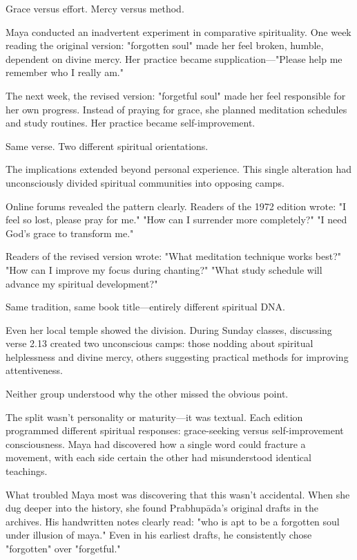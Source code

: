 \documentclass[11pt,twoside]{book}
\begin{document}
Grace versus effort. Mercy versus method.

Maya conducted an inadvertent experiment in comparative spirituality. One week reading the original version: "forgotten soul" made her feel broken, humble, dependent on divine mercy. Her practice became supplication—"Please help me remember who I really am."

The next week, the revised version: "forgetful soul" made her feel responsible for her own progress. Instead of praying for grace, she planned meditation schedules and study routines. Her practice became self-improvement.

Same verse. Two different spiritual orientations.

The implications extended beyond personal experience. This single alteration had unconsciously divided spiritual communities into opposing camps.

Online forums revealed the pattern clearly. Readers of the 1972 edition wrote: "I feel so lost, please pray for me." "How can I surrender more completely?" "I need God's grace to transform me."

Readers of the revised version wrote: "What meditation technique works best?" "How can I improve my focus during chanting?" "What study schedule will advance my spiritual development?"

Same tradition, same book title—entirely different spiritual DNA.

Even her local temple showed the division. During Sunday classes, discussing verse 2.13 created two unconscious camps: those nodding about spiritual helplessness and divine mercy, others suggesting practical methods for improving attentiveness.

Neither group understood why the other missed the obvious point.

The split wasn't personality or maturity—it was textual. Each edition programmed different spiritual responses: grace-seeking versus self-improvement consciousness. Maya had discovered how a single word could fracture a movement, with each side certain the other had misunderstood identical teachings.

What troubled Maya most was discovering that this wasn't accidental. When she dug deeper into the history, she found Prabhupāda's original drafts in the archives. His handwritten notes clearly read: "who is apt to be a forgotten soul under illusion of maya." Even in his earliest drafts, he consistently chose "forgotten" over "forgetful."
\end{document}
